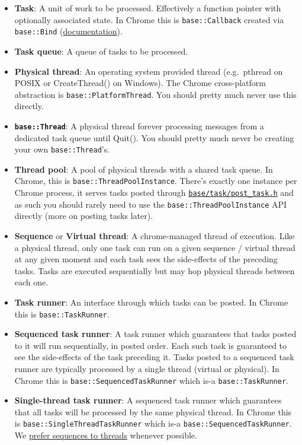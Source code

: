 \documentclass[a4paper,12pt,notitlepage,twoside,openright]{article}
\begin{document}
\begin{itemize}
\item
  \textbf{Task}: A unit of work to be processed. Effectively a function
  pointer with optionally associated state. In Chrome this is
  \texttt{base::Callback} created via \texttt{base::Bind}
  (\href{https://chromium.googlesource.com/chromium/src/+/HEAD/docs/callback.md}{documentation}).
\item
  \textbf{Task queue}: A queue of tasks to be processed.
\item
  \textbf{Physical thread}: An operating system provided thread
  (e.g.~pthread on POSIX or CreateThread() on Windows). The Chrome
  cross-platform abstraction is \texttt{base::PlatformThread}. You
  should pretty much never use this directly.
\item
  \textbf{\texttt{base::Thread}}: A physical thread forever processing
  messages from a dedicated task queue until Quit(). You should pretty
  much never be creating your own \texttt{base::Thread}'s.
\item
  \textbf{Thread pool}: A pool of physical threads with a shared task
  queue. In Chrome, this is \texttt{base::ThreadPoolInstance}. There's
  exactly one instance per Chrome process, it serves tasks posted
  through
  \href{https://cs.chromium.org/chromium/src/base/task/post_task.h}{\texttt{base/task/post\_task.h}}
  and as such you should rarely need to use the
  \texttt{base::ThreadPoolInstance} API directly (more on posting tasks
  later).
\item
  \textbf{Sequence} or \textbf{Virtual thread}: A chrome-managed thread
  of execution. Like a physical thread, only one task can run on a given
  sequence / virtual thread at any given moment and each task sees the
  side-effects of the preceding tasks. Tasks are executed sequentially
  but may hop physical threads between each one.
\item
  \textbf{Task runner}: An interface through which tasks can be posted.
  In Chrome this is \texttt{base::TaskRunner}.
\item
  \textbf{Sequenced task runner}: A task runner which guarantees that
  tasks posted to it will run sequentially, in posted order. Each such
  task is guaranteed to see the side-effects of the task preceding it.
  Tasks posted to a sequenced task runner are typically processed by a
  single thread (virtual or physical). In Chrome this is
  \texttt{base::SequencedTaskRunner} which is-a
  \texttt{base::TaskRunner}.
\item
  \textbf{Single-thread task runner}: A sequenced task runner which
  guarantees that all tasks will be processed by the same physical
  thread. In Chrome this is \texttt{base::SingleThreadTaskRunner} which
  is-a \texttt{base::SequencedTaskRunner}. We
  \protect\hyperlink{prefer-sequences-to-physical-threads}{prefer
  sequences to threads} whenever possible.
\end{itemize}
\end{document}
